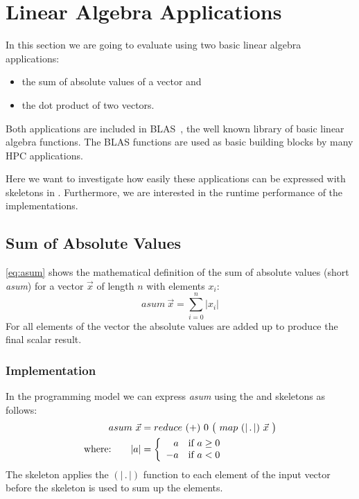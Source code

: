 \section{Linear Algebra Applications}
\label{section:skelcl:evaluation:linearAlgebra}

In this section we are going to evaluate \SkelCL using two basic linear algebra applications:
\begin{itemize}
  \item the sum of absolute values of a vector and
  \item the dot product of two vectors.
\end{itemize}

Both applications are included in BLAS~\cite{Dongarra2002,Dongarra2002a}, the well known library of basic linear algebra functions.
The BLAS functions are used as basic building blocks by many HPC applications.

Here we want to investigate how easily these applications can be expressed with skeletons in \SkelCL.
Furthermore, we are interested in the runtime performance of the \SkelCL implementations.

\subsection*{Sum of Absolute Values}
\label{sec:asum}
\autoref{eq:asum} shows the mathematical definition of the sum of absolute values (short \emph{asum}) for a vector $\vec{x}$ of length $n$ with elements $x_i$:
\begin{equation}
  asum\ \vec{x} = \sum_{i=0}^{n} | x_i |
  \label{eq:asum}
\end{equation}
For all elements of the vector the absolute values are added up to produce the final scalar result.

\subsubsection*{\SkelCL Implementation}
In the \SkelCL programming model we can express \emph{asum} using the \map and \reduce skeletons as follows:
\begin{align}
  asum\ \vec{x} &= reduce\ (+)\ 0\ \big(\ map\ (|\, .\, |)\ \vec{x}\ \big)\label{eq:asum:skelcl}\\
  \text{where:} \qquad | a | &=
    \left\{
      \begin{array}{r l}
      a & \text{if } a \geq 0\\
      -a & \text{if } a < 0
      \end{array}
    \right.\nonumber
\end{align}
The \map skeleton applies the $(|\, .\, |)$ function to each element of the input vector before the \reduce skeleton is used to sum up the elements.

